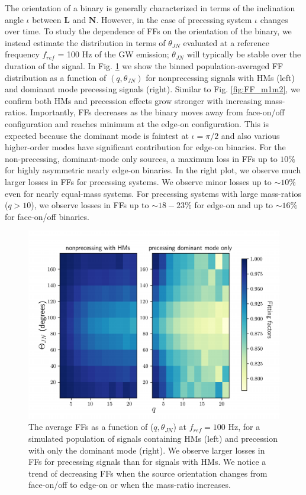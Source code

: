 The orientation of a binary is generally characterized in terms of the inclination angle $\iota$ between $\textbf{L}$ and $\textbf{N}$. However, in the case of precessing system $\iota$ changes over time. To study the dependence of FFs on the orientation of the binary, we instead estimate the distribution in terms of $\theta_{JN}$ evaluated at a reference frequency $f_{ref}$ = 100 Hz of the GW emission; $\theta_{JN}$ will typically be stable over the duration of the signal. In Fig. \ref{fig:FF_orientation} we show the binned population-averaged FF distribution as a function of $(q,\theta_{JN})$ for nonprecessing signals with HMs (left) and dominant mode precessing signals (right). Similar to Fig. \ref{fig:FF_m1m2}, we confirm both HMs and precession effects grow stronger with increasing mass-ratios. Importantly, FFs decreases as the binary moves away from face-on/off configuration and reaches minimum at the edge-on configuration. This is expected because the dominant mode is faintest at $\iota=\pi/2$ and also various higher-order modes have significant contribution for edge-on binaries. 
For the non-precessing, dominant-mode only sources, a maximum loss in FFs up to $10\%$ for highly asymmetric nearly edge-on binaries. In the right plot, we observe much larger losses in FFs for precessing systems. We observe minor losses up to $\sim 10\%$ even for nearly equal-mass systems. For precessing systems with large mass-ratios ($q > 10$), we observe losses in FFs up to $\sim 18-23\%$ for edge-on and up to $\sim 16\%$ for face-on/off binaries.

\begin{figure}
    \centering
    \includegraphics[width=\linewidth]{figures/HM_and_precession/aLIGO_FF_orientation.pdf}
    \caption{ The average FFs as a function of ($q, \theta_{JN}$) at $f_{ref} = 100$ Hz, for a simulated population of signals containing HMs  (left) and precession with only the dominant mode (right). We observe larger losses in FFs for precessing signals than for signals with HMs. We notice a trend of decreasing FFs when the source orientation changes from face-on/off to edge-on or when the mass-ratio increases.}
    \label{fig:FF_orientation}
\end{figure}

